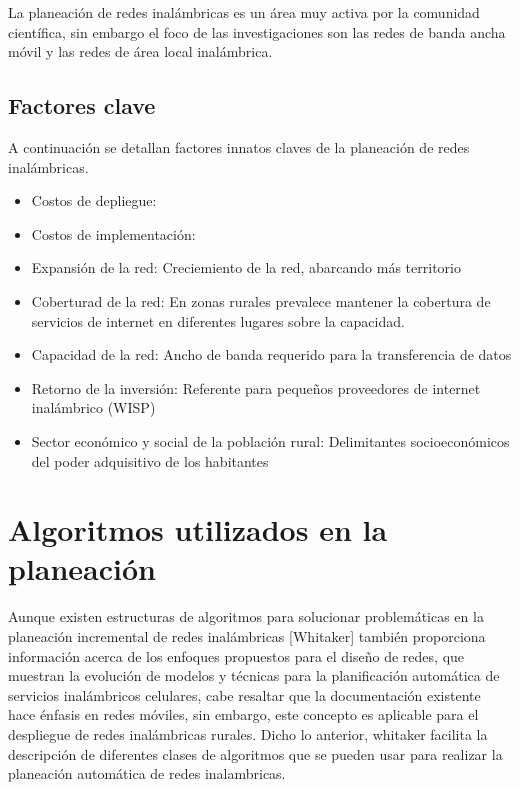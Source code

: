 \documentclass[]{article}
\providecommand{\tightlist}{%
  \setlength{\itemsep}{0pt}\setlength{\parskip}{0pt}}
\begin{document}
La planeación de redes inalámbricas es un área muy activa por la
comunidad científica, sin embargo el foco de las investigaciones son las
redes de banda ancha móvil y las redes de área local inalámbrica.

\subsection{Factores clave}\label{factores-clave}

A continuación se detallan factores innatos claves de la planeación de
redes inalámbricas.

\begin{itemize}
\tightlist
\item
  Costos de depliegue:
\item
  Costos de implementación:
\item
  Expansión de la red: Creciemiento de la red, abarcando más territorio
\item
  Coberturad de la red: En zonas rurales prevalece mantener la cobertura
  de servicios de internet en diferentes lugares sobre la capacidad.
\item
  Capacidad de la red: Ancho de banda requerido para la transferencia de
  datos
\item
  Retorno de la inversión: Referente para pequeños proveedores de
  internet inalámbrico (WISP)
\item
  Sector económico y social de la población rural: Delimitantes
  socioeconómicos del poder adquisitivo de los habitantes
\end{itemize}

\section{Algoritmos utilizados en la
planeación}\label{algoritmos-utilizados-en-la-planeaciuxf3n}

Aunque existen estructuras de algoritmos para solucionar problemáticas
en la planeación incremental de redes inalámbricas {[}Whitaker{]}
también proporciona información acerca de los enfoques propuestos para
el diseño de redes, que muestran la evolución de modelos y técnicas para
la planificación automática de servicios inalámbricos celulares, cabe
resaltar que la documentación existente hace énfasis en redes móviles,
sin embargo, este concepto es aplicable para el despliegue de redes
inalámbricas rurales. Dicho lo anterior, whitaker facilita la
descripción de diferentes clases de algoritmos que se pueden usar para
realizar la planeación automática de redes inalambricas.
\end{document}
